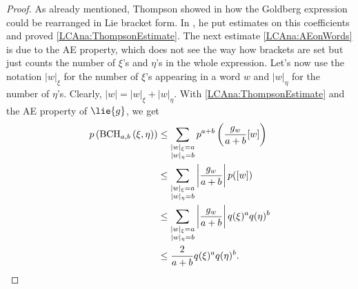 \begin{proof}
	As already mentioned, Thompson showed in \cite{thompson:1982a} how the 
	Goldberg expression could be rearranged in Lie bracket form. In 
	\cite{thompson:1989a}, he put estimates on this coefficients and proved 
	\eqref{LCAna:ThompsonEstimate}. The next estimate \eqref{LCAna:AEonWords} 
	is due to the AE property, which does not see the way how brackets are set 
	but just counts the number of $\xi$'s and $\eta$'s in the whole 
	expression.
	Let's now use the notation $|w|_{\xi}$ for the number of $\xi$'s appearing
	in a word $w$ and $|w|_{\eta}$ for the number of $\eta$'s. Clearly, $|w| =
	|w|_{\xi} + |w|_{\eta}$. With \eqref{LCAna:ThompsonEstimate} and the AE
	property of $\lie{g}$, we get
	\begin{align*}
		p \left(
			\mathrm{BCH}_{a, b}\left(\xi, \eta\right)
		\right)
		& \leq
		\sum\limits_{\substack{
			|w|_{\xi} = a \\
			|w|_{\eta} = b
		}}
		p^{a + b} \left(
			\frac{g_w}{a + b}
			[w]
		\right)
		\\
		& \leq
		\sum\limits_{\substack{
			|w|_{\xi} = a \\
			|w|_{\eta} = b
		}}
		\left| \frac{g_w}{a + b} \right|
		p([w])
		\\
		& \leq
		\sum\limits_{\substack{
			|w|_{\xi} = a \\
			|w|_{\eta} = b
		}}
		\left| \frac{g_w}{a + b} \right|
		q(\xi)^a q(\eta)^b
		\\
		& \leq
		\frac{2}{a + b}
		q(\xi)^a q(\eta)^b.
	\end{align*}
\end{proof}

